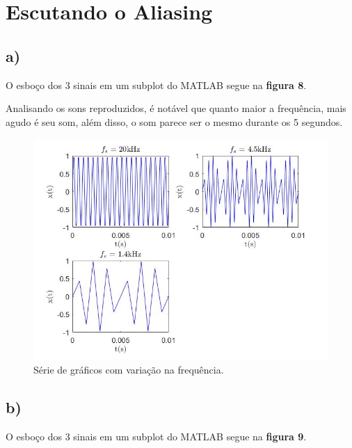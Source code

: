 \documentclass[a4paper, 12pt]{article}
\begin{document}
\section{Escutando o Aliasing}

\subsection{a)}

O esboço dos 3 sinais em um subplot do MATLAB segue na \textbf{figura 8}.

Analisando os sons reproduzidos, é notável que quanto maior a frequência, mais agudo é seu som, além disso, o som parece ser o mesmo durante os 5 segundos.



\begin{figure}[H]
	\centering
	\includegraphics[scale=0.5]{../Imagens/ex3/a.jpg} 
	\caption{Série de gráficos com variação na frequência.}
	\label{fig:3a}
\end{figure}


\subsection{b)}

O esboço dos 3 sinais em um subplot do MATLAB segue na \textbf{figura 9}.
\end{document}
